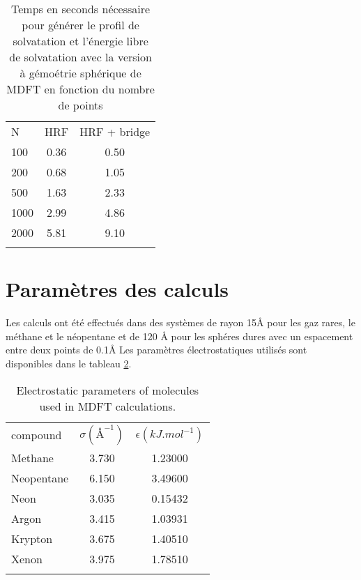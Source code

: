 \begin{table}[!htbp]
  \begin{tabular}{ l c c}
    \hline & \\[-1em]\hline
    N   & HRF  & HRF + bridge \\
    \hline
    100     & 0.36 & 0.50 \\
    200     & 0.68 & 1.05 \\
    500     & 1.63 & 2.33 \\
   1000     & 2.99 & 4.86 \\
   2000     & 5.81 & 9.10 \\
    \hline & \\[-1em]\hline
  \end{tabular}
  \caption{Temps en seconds nécessaire pour générer le profil de solvatation et l'énergie libre de solvatation avec la version à gémoétrie sphérique de MDFT en fonction du nombre de points}
  \label{tab:times}
\end{table}

\section{Paramètres des calculs} \label{app:calculParam}
Les calculs ont été effectués dans des systèmes de rayon 15$\text{\AA}$ pour les gaz rares, le méthane et le néopentane et de 120 $\text{\AA}$ pour les sphéres dures avec un espacement entre deux points de 0.1$\text{\AA}$
Les paramètres électrostatiques utilisés sont disponibles dans le tableau \ref{tab:electrostatParam}.

\begin{table}[!htbp]
  \begin{tabular}{ l c c }
    \hline & \\[-1em]\hline
    compound   & $\sigma (\text{\AA}^{-1})$  & $\epsilon (kJ.mol^{-1})$ \\
    \hline
    Methane    & 3.730 & 1.23000 \\
    Neopentane & 6.150 & 3.49600 \\ 
    Neon       & 3.035 & 0.15432 \\
    Argon      & 3.415 & 1.03931 \\
    Krypton    & 3.675 & 1.40510 \\
    Xenon      & 3.975 & 1.78510 \\
    \hline & \\[-1em]\hline
  \end{tabular}
  \caption{Electrostatic parameters of molecules used in MDFT calculations.}
  \label{tab:electrostatParam}  
\end{table}


